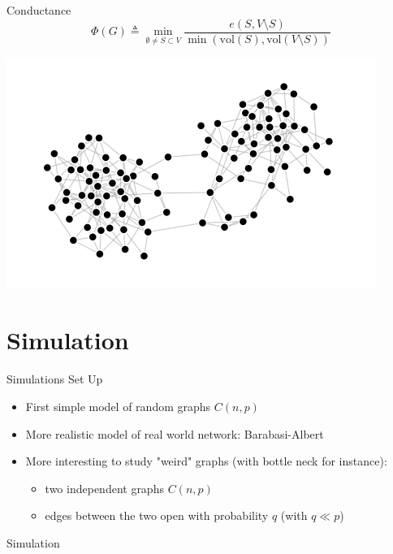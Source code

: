 \documentclass{beamer}
\begin{document}
\begin{frame}{Conductance}
      \[
        \Phi(G) \triangleq \min_{\emptyset \not = S \subset V} \frac{e(S, V \setminus S)}{\min(\text{vol}(S), \text{vol}(V \setminus S))}
      \]
      \begin{center}
        
  \includegraphics[width=.9\linewidth]{graph}
      \end{center}
\end{frame}


\section{Simulation}

\frame{\sectionpage}

\begin{frame}{Simulations Set Up}
\begin{itemize}
  \item 
    First simple model of random graphs $C(n,p)$

  \item
    More realistic model of real world network: Barabasi-Albert
  \item More interesting to study "weird" graphs (with bottle neck for instance): 
  \begin{itemize}
    \item two independent graphs $C(n,p)$
    \item edges between the two open with probability $q$ (with $q\ll p$)
  \end{itemize}
\end{itemize}

\end{frame}

\begin{frame}{Simulation}
  
\end{frame}
\end{document}
